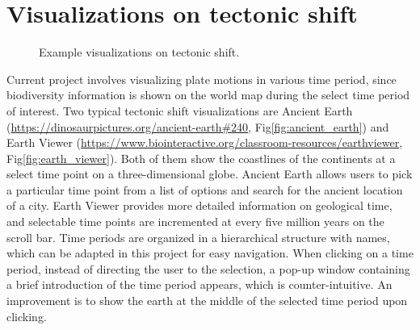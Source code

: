 \documentclass[11pt, a4paper,oneside,chapterprefix=false]{scrbook}
\begin{document}
\section{Visualizations on tectonic shift}
\begin{figure}[h]
	\centering
	\hfill
	\caption{Example visualizations on tectonic shift. }
	\label{fig:tectonic_shift}
\end{figure}
Current project involves visualizing plate motions in various time period, since biodiversity information is shown on the world map during the select time period of interest. Two typical tectonic shift visualizations are Ancient Earth (\url{https://dinosaurpictures.org/ancient-earth#240}, Fig\ref{fig:ancient_earth}) and Earth Viewer (\url{https://www.biointeractive.org/classroom-resources/earthviewer}, Fig\ref{fig:earth_viewer}). Both of them show the coastlines of the continents at a select time point on a three-dimensional globe. Ancient Earth allows users to pick a particular time point from a list of options and search for the ancient location of a city. Earth Viewer provides more detailed information on geological time, and selectable time points are incremented at every five million years on the scroll bar. Time periods are organized in a hierarchical structure with names, which can be adapted in this project for easy navigation. When clicking on a time period, instead of directing the user to the selection, a pop-up window containing a brief introduction of the time period appears, which is counter-intuitive. An improvement is to show the earth at the middle of the selected time period upon clicking.
\end{document}
